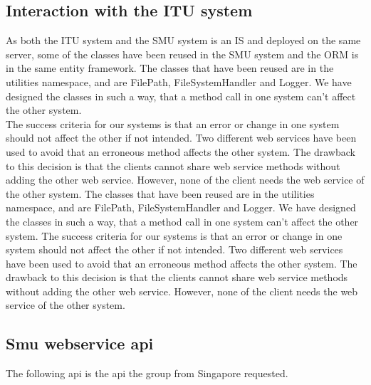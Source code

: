 \documentclass[a4paper,11pt,report]{article}
\begin{document}
\subsection{Interaction with the ITU system}
As both the ITU system and the SMU system is an IS and deployed on the same server,  some of the classes have been reused in the SMU system and the ORM is in the same entity framework.
The classes that have been reused are in the utilities namespace, and are FilePath, FileSystemHandler and Logger. We have designed the classes in such a way, that a method call in one system can't affect the other system. \\
The success criteria for our systems is that an error or change in one system should not affect the other if not intended. Two different web services have been used to avoid that an erroneous method affects the other system.
The drawback to this decision is that the clients cannot share web service methods without adding the other web service. However, none of the client needs the web service of the other system. 
The classes that have been reused are in the utilities namespace, and are FilePath, FileSystemHandler and Logger. We have designed the classes in such a way, that a method call in one system can't affect the other system.
The success criteria for our systems is that an error or change in one system should not affect the other if not intended. Two different web services have been used to avoid that an erroneous method affects the other system.
The drawback to this decision is that the clients cannot share web service methods without adding the other web service. However, none of the client needs the web service of the other system. 

\subsection{Smu webservice api}

The following api is the api the group from Singapore requested. 
\end{document}

